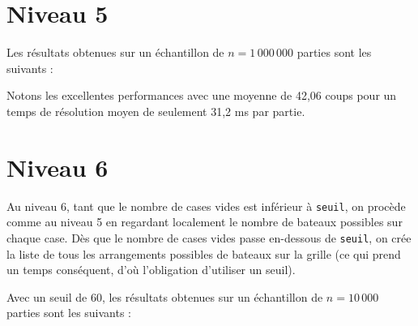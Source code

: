 \newpage
\section{Niveau 5}
Les résultats obtenues sur un échantillon de $n=1\,000\,000$ parties sont les suivants :

\begin{center}
\end{center}

Notons les excellentes performances avec une moyenne de 42,06 coups pour un temps de résolution moyen de seulement 31,2 ms par partie. 

\newpage
\section{Niveau 6}
Au niveau 6, tant que le nombre de cases vides est inférieur à \texttt{seuil}, on procède comme au niveau 5 en regardant localement le nombre de bateaux possibles sur chaque case. Dès que le nombre de cases vides passe en-dessous de \texttt{seuil}, on crée la liste de tous les arrangements possibles de bateaux sur la grille (ce qui prend un temps conséquent, d'où l'obligation d'utiliser un seuil).

Avec un seuil de 60, les résultats obtenues sur un échantillon de $n=10\,000$ parties sont les suivants :

